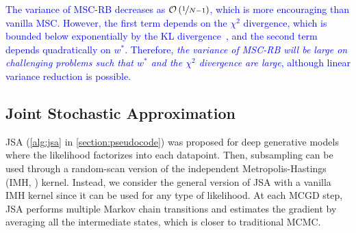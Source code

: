 

\textcolor{blue}{
The variance of MSC-RB decreases as \(\mathcal{O}\left(\nicefrac{1}{N-1}\right)\), which is more encouraging than vanilla MSC.
However, the first term depends on the \(\chi^2\) divergence, which is bounded below exponentially by the KL divergence~\citep{10.1214/17-STS611}, and the second term depends quadratically on \(w^*\).
Therefore, \textit{the variance of MSC-RB will be large on challenging problems such that \(w^*\) and the \(\chi^2\) divergence are large}, although linear variance reduction is possible.
}

\vspace{-0.1in}
\subsection{Joint Stochastic Approximation}
\vspace{-0.1in}
JSA (\cref{alg:jsa} in \cref{section:pseudocode}) was proposed for deep generative models where the likelihood factorizes into each datapoint.
Then, subsampling can be used through a random-scan version of the independent Metropolis-Hastings (IMH, \citealt{hastings_monte_1970}) kernel.
Instead, we consider the general version of JSA with a vanilla IMH kernel since it can be used for any type of likelihood.
At each MCGD step, JSA performs multiple Markov chain transitions and estimates the gradient by averaging all the intermediate states, which is closer to traditional MCMC.

\vspace{-0.1in}
